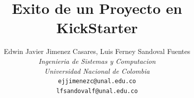 \documentclass[journal]{IEEEtran}
\begin{document}
%
\title{Exito de un Proyecto en KickStarter}
%
%
%

\author{Edwin Javier Jimenez Casares,
        Luis Ferney Sandoval Fuentes\\
\textit{Ingenieria de Sistemas y Computacion\\ Universidad Nacional de Colombia}
\texttt{\\ejjimenezc@unal.edu.co}
\texttt{\\lfsandovalf@unal.edu.co}
}



% 
%


\end{document}
